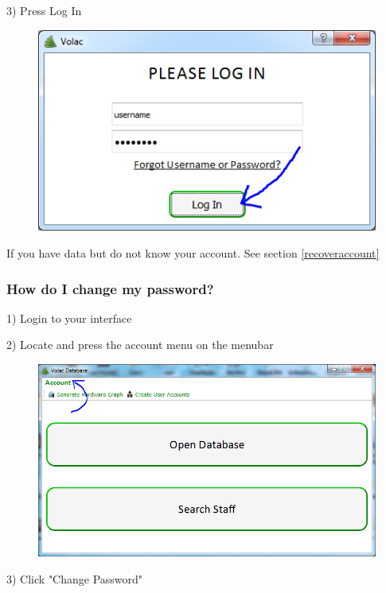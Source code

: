 3) Press Log In

\begin{figure}[H]
    \includegraphics[width=\textwidth]{./Manual/Images/login2.png}
\end{figure}


If you have data but do not know your account. See section \ref{recoveraccount}

\subsubsection{How do I change my password?}\label{changepass}

1) Login to your interface

2) Locate and press the account menu on the menubar

\begin{figure}[H]
    \includegraphics[width=\textwidth]{./Manual/Images/changepass.png}
\end{figure}

3) Click "Change Password"

